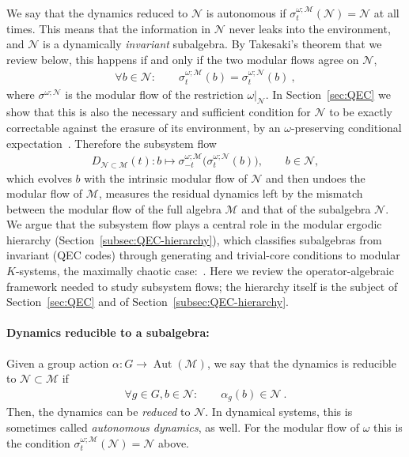 \documentclass[a4paper,11pt]{article}
\theoremstyle{definition}
\newcommand{\mB}{\mathcal{B}}%
\newcommand{\mN}{\mathcal{N}}
\newcommand{\mH}{\mathcal{H}}
\newcommand{\mM}{\mathcal{M}}
\begin{document}
We say that the dynamics reduced to $\mN$ is autonomous if $\sigma^{\omega;\mM}_t(\mN)=\mN$ at all times. This means that the information in $\mN$ never leaks into the environment, and $\mN$ is a dynamically \emph{invariant} subalgebra. By Takesaki's theorem \cite{Takesaki1972} that we review below, this happens if and only if the two modular flows agree on $\mN$,
\begin{align}
    \forall b\in\mN:\qquad \sigma^{\omega;\mM}_t(b)=\sigma^{\omega;\mN}_t(b)\ ,
\end{align}
where $\sigma^{\omega;\mN}$ is the modular flow of the restriction $\omega|_{\mN}$. In Section~\ref{sec:QEC} we show that this is also the necessary and sufficient condition for $\mN$ to be exactly correctable against the erasure of its environment, by an $\omega$-preserving conditional expectation~\cite{FuruyaLashkariOuseph2022RG}. Therefore the subsystem flow
\begin{align}
   D_{\mN\subset \mM}(t): b\longmapsto\sigma^{\omega;\mM}_{-t}\bigl(\sigma^{\omega;\mN}_t(b)\bigr),\qquad b\in\mN,
    \label{eq:subsystem-flow-preview}
\end{align}
which evolves $b$ with the intrinsic modular flow of $\mN$ and then undoes the modular flow of $\mM$, measures the residual dynamics left by the mismatch between the modular flow of the full algebra $\mM$ and that of the subalgebra $\mN$. 
We argue that the subsystem flow plays a central role in the modular ergodic hierarchy (Section~\ref{subsec:QEC-hierarchy}), which classifies subalgebras from invariant (QEC codes) through generating and trivial-core conditions to modular $K$-systems, the maximally chaotic case:~\cite{OFLLM2024}.
Here we review the operator-algebraic framework needed to study subsystem flows; the hierarchy itself is the subject of Section~\ref{sec:QEC} and of Section~\ref{subsec:QEC-hierarchy}.

\paragraph{Dynamics reducible to a subalgebra:} Given a group action $\alpha:G\to\operatorname{Aut}(\mM)$, we say that the dynamics is reducible to $\mN\subset\mM$ if
\begin{align}
    \forall g\in G,b\in\mN:\qquad \alpha_g(b)\in \mN\ .
\end{align}
Then, the dynamics can be {\it reduced} to $\mN$. In dynamical systems, this is sometimes called {\it autonomous dynamics}, as well. For the modular flow of $\omega$ this is the condition $\sigma^{\omega;\mM}_t(\mN)=\mN$ above.
\end{document}
